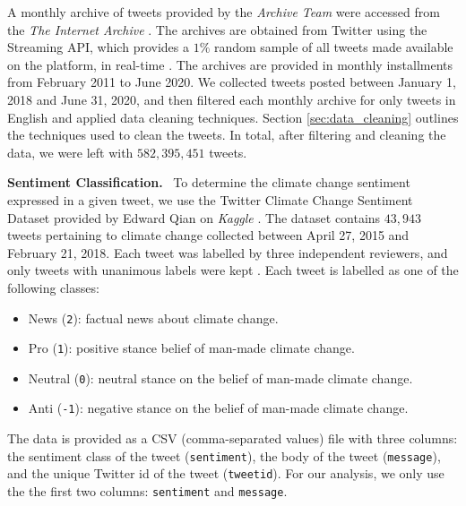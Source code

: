\documentclass{paper}
\newcommand{\inlineSection}[1]{\vspace{0.5em}\noindent\textbf{#1.}~}
\begin{document}
A monthly archive of tweets provided by the \textit{Archive Team} were accessed from the \textit{The Internet Archive} \cite{data_the_internet_archive}. The archives are obtained from Twitter using the Streaming API, which provides a $1\%$ random sample of all tweets made available on the platform, in real-time \cite{twitter_streaming_api}. The archives are provided in monthly installments from February 2011 to June 2020. We collected tweets posted between January 1, 2018 and June 31, 2020, and then filtered each monthly archive for only tweets in English and applied data cleaning techniques. Section \ref{sec:data_cleaning} outlines the techniques used to clean the tweets. In total, after filtering and cleaning the data, we were left with $582,395,451$ tweets.

\inlineSection{Sentiment Classification} To determine the climate change sentiment expressed in a given tweet, we use the Twitter Climate Change Sentiment Dataset provided by Edward Qian on \textit{Kaggle} \cite{kaggle:twitter_sentiment_data}. The dataset contains $43,943$ tweets pertaining to climate change collected between April 27, 2015 and February 21, 2018. Each tweet was labelled by three independent reviewers, and only tweets with unanimous labels were kept \cite{kaggle:twitter_sentiment_data}. Each tweet is labelled as one of the following classes:
\begin{itemize}
    \item News (\texttt{2}): factual news about climate change.
    \item Pro (\texttt{1}): positive stance belief of man-made climate change.
    \item Neutral (\texttt{0}): neutral stance on the belief of man-made climate change.
    \item Anti (\texttt{-1}): negative stance on the belief of man-made climate change.
\end{itemize}

The data is provided as a CSV (comma-separated values) file with three columns: the sentiment class of the tweet (\texttt{sentiment}), the body of the tweet (\texttt{message}), and the unique Twitter id of the tweet (\texttt{tweetid}). For our analysis, we only use the the first two columns: \texttt{sentiment} and \texttt{message}.
\end{document}
